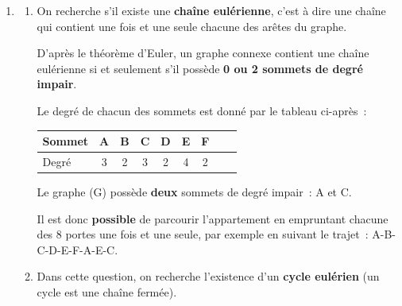 \begin{corrige}
\begin{enumerate}
          \item %
         
          \begin{enumerate}[label=\alph*.]
               \item %
               On recherche s'il existe une \textbf{chaîne eulérienne}, c'est à dire une chaîne qui contient une fois et une seule chacune des arêtes du graphe.
              
               D'après le théorème d'Euler, un graphe connexe contient une chaîne eulérienne si et seulement s'il possède \textbf{0 ou 2 sommets de degré impair}.
              
               Le degré de chacun des sommets est donné par le tableau ci-après~:
              
               \begin{center}
                    \begin{tabular}{|l|c|c|c|c|c|c|c|c|}%
                         \hline
                         Sommet & A & B & C & D & E & F  \\
                         \hline
                         Degré & 3 & 2 & 3 & 2 & 4 & 2 \\
                         \hline
                    \end{tabular}
               \end{center}
              
               Le graphe (G) possède \textbf{deux} sommets de degré impair~: A et C.
              
               Il est donc \textbf{possible} de parcourir l'appartement en empruntant chacune des 8 portes une fois et une seule, par exemple en suivant le trajet~: A-B-C-D-E-F-A-E-C.
              
              
               \item %
               Dans cette question, on recherche l'existence d'un \textbf{cycle eulérien} (un cycle est une chaîne fermée).
              

\end{enumerate}
\end{enumerate}
\end{corrige}
